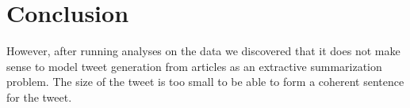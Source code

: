 \section{Conclusion}

However, after running analyses on the data we discovered that it does not make sense to model tweet generation from articles as an extractive summarization problem. The size of the tweet is too small to be able to form a coherent sentence for the tweet.